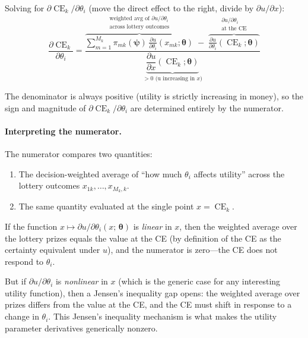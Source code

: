 \documentclass[11pt,a4paper]{article}
\theoremstyle{definition}
\newcommand{\btheta}{\boldsymbol{\theta}}
\newcommand{\bpsi}{\boldsymbol{\psi}}
\DeclareMathOperator{\CE}{CE}
\begin{document}
Solving for $\partial \CE_k / \partial \theta_i$ (move the direct effect to
the right, divide by $\partial u / \partial x$):
\begin{equation}
    \label{eq:dCE_dtheta}
    \frac{\partial \CE_k}{\partial \theta_i}
    = \frac{
        \overbrace{
            \displaystyle\sum_{m=1}^{M_k} \pi_{mk}(\bpsi) \,
            \frac{\partial u}{\partial \theta_i}(x_{mk}; \btheta)
        }^{\substack{\text{weighted avg of } \partial u/\partial\theta_i\\
        \text{across lottery outcomes}}}
        \;-\;
        \overbrace{
            \frac{\partial u}{\partial \theta_i}(\CE_k; \btheta)
        }^{\substack{\partial u/\partial\theta_i\\
        \text{at the CE}}}
    }{
        \underbrace{
            \dfrac{\partial u}{\partial x}(\CE_k; \btheta)
        }_{> 0 \text{ (u increasing in } x\text{)}}
    }
\end{equation}

The denominator is always positive (utility is strictly increasing in money),
so the sign and magnitude of $\partial \CE_k / \partial \theta_i$ are
determined entirely by the numerator.

\paragraph{Interpreting the numerator.}
The numerator compares two quantities:
\begin{enumerate}
    \item The decision-weighted average of ``how much $\theta_i$ affects
    utility'' across the lottery outcomes $x_{1k}, \ldots, x_{M_k,k}$.
    \item The same quantity evaluated at the single point $x = \CE_k$.
\end{enumerate}

If the function $x \mapsto \partial u / \partial \theta_i(x;\, \btheta)$ is
\emph{linear} in $x$, then the weighted average over the lottery prizes
equals the value at the CE (by definition of the CE as the certainty
equivalent under $u$), and the numerator is zero---the CE does not respond to
$\theta_i$.

But if $\partial u / \partial \theta_i$ is \emph{nonlinear} in $x$ (which is
the generic case for any interesting utility function), then a Jensen's
inequality gap opens: the weighted average over prizes differs from the value
at the CE, and the CE must shift in response to a change in $\theta_i$.
This Jensen's inequality mechanism is what makes the utility parameter
derivatives generically nonzero.
\end{document}
